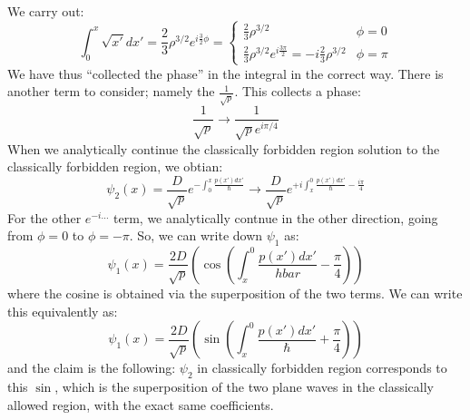 We carry out:
\begin{equation}
    \int_0^x \sqrt{x'}dx' = \frac{2}{3}\rho^{3/2}e^{i\frac{3}{2}\phi} = \begin{cases}
        \frac{2}{3}\rho^{3/2} & \phi = 0
        \\ \frac{2}{3}\rho^{3/2}e^{i\frac{3\pi}{2}} = -i\frac{2}{3}\rho^{3/2} & \phi = \pi
    \end{cases}
\end{equation}
We have thus ``collected the phase'' in the integral in the correct way. There is another term to consider; namely the $\frac{1}{\sqrt{p}}$. This collects a phase:
\begin{equation}
    \frac{1}{\sqrt{p}} \to \frac{1}{\sqrt{p}e^{i\pi/4}}
\end{equation}
When we analytically continue the classically forbidden region solution to the classically forbidden region, we obtian:
\begin{equation}
   \psi_2(x) = \frac{D}{\sqrt{p}}e^{-\int_0^x \frac{p(x')dx'}{\hbar}} \to \frac{D}{\sqrt{p}}e^{+i\int_x^0 \frac{p(x')dx'}{\hbar} - \frac{i\pi}{4}}
\end{equation}
For the other $e^{-i\ldots}$ term, we analytically contnue in the other direction, going from $\phi = 0$ to $\phi = -\pi$. So, we can write down $\psi_1$ as:
\begin{equation}
    \psi_1(x) = \frac{2D}{\sqrt{p}}\left(\cos(\int_x^0 \frac{p(x')dx'}{hbar} - \frac{\pi}{4})\right)
\end{equation}
where the cosine is obtained via the superposition of the two terms. We can write this equivalently as:
\begin{equation}
    \psi_1(x) = \frac{2D}{\sqrt{p}}\left(\sin(\int_x^0 \frac{p(x')dx'}{\hbar} + \frac{\pi}{4})\right)
\end{equation}
and the claim is the following: $\psi_2$ in classically forbidden region corresponds to this $\sin$, which is the superposition of the two plane waves in the classically allowed region, with the exact same coefficients.